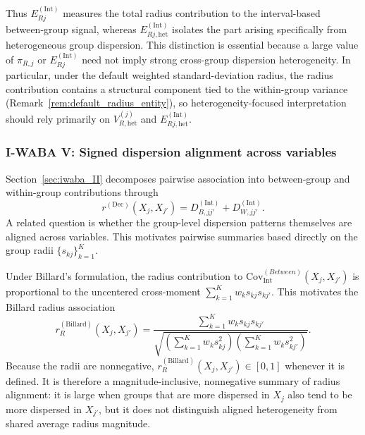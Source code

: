 \documentclass[preprint, times, 12pt, authoryear]{elsarticle}
\begin{document}
Thus \(E_{Rj}^{(\mathrm{Int})}\) measures the total radius contribution to the interval-based between-group signal, whereas \(E_{Rj,\mathrm{het}}^{(\mathrm{Int})}\) isolates the part arising specifically from heterogeneous group dispersion. This distinction is essential because a large value of \(\pi_{R,j}\) or \(E_{Rj}^{(\mathrm{Int})}\) need not imply strong cross-group dispersion heterogeneity. In particular, under the default weighted standard-deviation radius, the radius contribution contains a structural component tied to the within-group variance (Remark~\ref{rem:default_radius_entity}), so heterogeneity-focused interpretation should rely primarily on \(V_{R,\mathrm{het}}^{(j)}\) and \(E_{Rj,\mathrm{het}}^{(\mathrm{Int})}\).

\subsubsection{I-WABA V: Signed dispersion alignment across variables}\label{sec:iwaba_V}

Section~\ref{sec:iwaba_II} decomposes pairwise association into between-group and within-group contributions through
\[
r^{(\mathrm{Dec})}(X_j,X_{j'})=D_{B,jj'}^{(\mathrm{Int})}+D_{W,jj'}^{(\mathrm{Int})}.
\]
A related question is whether the group-level dispersion patterns themselves are aligned across variables. This motivates pairwise summaries based directly on the group radii \(\{s_{kj}\}_{k=1}^K\).

Under Billard's formulation, the radius contribution to \(\mathrm{Cov}_{\mathrm{Int}}^{(Between)}(X_j,X_{j'})\) is proportional to the uncentered cross-moment \(\sum_{k=1}^K w_k s_{kj}s_{kj'}\). This motivates the Billard radius association
\begin{equation}\label{eq:r_radius_billard}
	r_{R}^{(\mathrm{Billard})}(X_j,X_{j'})
	=
	\frac{\sum_{k=1}^K w_k s_{kj}s_{kj'}}
	{\sqrt{\left(\sum_{k=1}^K w_k s_{kj}^2\right)\left(\sum_{k=1}^K w_k s_{kj'}^2\right)}}.
\end{equation}
Because the radii are nonnegative, \(r_{R}^{(\mathrm{Billard})}(X_j,X_{j'})\in[0,1]\) whenever it is defined. It is therefore a magnitude-inclusive, nonnegative summary of radius alignment: it is large when groups that are more dispersed in \(X_j\) also tend to be more dispersed in \(X_{j'}\), but it does not distinguish aligned heterogeneity from shared average radius magnitude.
\end{document}
